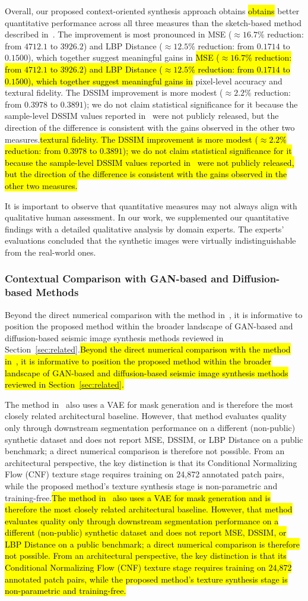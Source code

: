 \documentclass{ieeeaccess}
\makeatletter
\DeclareRobustCommand{\DIFaddbegin}{\DIFOaddbegin \let\includegraphics\DIFaddincludegraphics} %
\DeclareRobustCommand{\DIFaddend}{\DIFOaddend \let\includegraphics\DIFOincludegraphics} %
\DeclareRobustCommand{\DIFdelbegin}{\DIFOdelbegin \let\includegraphics\DIFdelincludegraphics} %
\DeclareRobustCommand{\DIFdelend}{\DIFOaddend \let\includegraphics\DIFOincludegraphics} %
\let\sout@orig\sout %
\renewcommand{\sout}[1]{\ifmmode\text{\sout@orig{\ensuremath{#1}}}\else\sout@orig{#1}\fi} %
\providecommand{\DIFadd}[1]{{\protect\color{blue}#1}}
\providecommand{\DIFdel}[1]{{\protect\color{red}\sout{#1}}}
\renewcommand{\DIFadd}[1]{\ifmmode#1\else\begingroup\let\protect\relax\hl{#1}\endgroup\fi}
\renewcommand{\DIFdel}[1]{}
\providecommand{\DIFaddbegin}{}
\providecommand{\DIFaddend}{}
\providecommand{\DIFdelbegin}{}
\providecommand{\DIFdelend}{}
\renewcommand{\DIFaddbegin}{}
\renewcommand{\DIFaddend}{}
\renewcommand{\DIFdelbegin}{}
\renewcommand{\DIFdelend}{}
\makeatother
\begin{document}
Overall, our proposed context-oriented synthesis approach \DIFdelbegin \DIFdel{tends to obtain a }\DIFdelend \DIFaddbegin \DIFadd{obtains }\DIFaddend better quantitative performance across all three measures than the sketch-based method described in~\cite{Ferreira2020}. The improvement is most pronounced in \DIFdelbegin \DIFdel{terms of the MSE and LBP distance measures, suggesting notable gains in terms of }\DIFdelend \DIFaddbegin \DIFadd{MSE ($\approx 16.7\%$ reduction: from $4712.1$ to $3926.2$) and LBP Distance ($\approx 12.5\%$ reduction: from $0.1714$ to $0.1500$), which together suggest meaningful gains in }\DIFaddend pixel-level accuracy and \DIFdelbegin \DIFdel{texture fidelity. }\DIFdelend \DIFaddbegin \DIFadd{textural fidelity. The DSSIM improvement is more modest ($\approx 2.2\%$ reduction: from $0.3978$ to $0.3891$); we do not claim statistical significance for it because the sample-level DSSIM values reported in~\cite{Ferreira2020} were not publicly released, but the direction of the difference is consistent with the gains observed in the other two measures.}\DIFaddend

It is important to observe that quantitative measures may not always align with qualitative human assessment. In our work, we supplemented our quantitative findings with a detailed qualitative analysis by domain experts. The experts' evaluations concluded that the synthetic images were virtually indistinguishable from the real-world ones.

\subsubsection{Contextual Comparison with GAN-based and Diffusion-based Methods}

\DIFaddbegin \DIFadd{Beyond the direct numerical comparison with the method in~\cite{Ferreira2020}, it is informative to position the proposed method within the broader landscape of GAN-based and diffusion-based seismic image synthesis methods reviewed in Section~\ref{sec:related}.}\DIFaddend

\DIFaddbegin \DIFadd{The method in~\cite{Henriques2021} also uses a VAE for mask generation and is therefore the most closely related architectural baseline. However, that method evaluates quality only through downstream segmentation performance on a different (non-public) synthetic dataset and does not report MSE, DSSIM, or LBP Distance on a public benchmark; a direct numerical comparison is therefore not possible. From an architectural perspective, the key distinction is that its Conditional Normalizing Flow (CNF) texture stage requires training on 24,872 annotated patch pairs, while the proposed method's texture synthesis stage is non-parametric and training-free.}\DIFaddend
\end{document}
